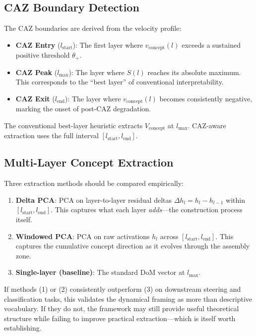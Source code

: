 \documentclass[11pt,a4paper]{article}
\begin{document}
\subsection{CAZ Boundary Detection}

The CAZ boundaries are derived from the velocity profile:
\begin{itemize}
	\item \textbf{CAZ Entry} ($l_\text{start}$): The first layer where
	      $v_\text{concept}(l)$ exceeds a sustained positive threshold $\theta_+$.
	\item \textbf{CAZ Peak} ($l_\text{max}$): The layer where $S(l)$ reaches its
	      absolute maximum. This corresponds to the ``best layer'' of conventional
	      interpretability.
	\item \textbf{CAZ Exit} ($l_\text{end}$): The layer where $v_\text{concept}(l)$
	      becomes consistently negative, marking the onset of post-CAZ degradation.
\end{itemize}

The conventional best-layer heuristic extracts $V_\text{concept}$ at $l_\text{max}$.
CAZ-aware extraction uses the full interval $[l_\text{start}, l_\text{end}]$.

\subsection{Multi-Layer Concept Extraction}

Three extraction methods should be compared empirically:

\begin{enumerate}
	\item \textbf{Delta PCA}: PCA on layer-to-layer residual deltas
	      $\Delta h_l = h_l - h_{l-1}$ within $[l_\text{start}, l_\text{end}]$.
	      This captures what each layer \emph{adds}---the construction process itself.
	\item \textbf{Windowed PCA}: PCA on raw activations $h_l$ across
	      $[l_\text{start}, l_\text{end}]$. This captures the cumulative concept
	      direction as it evolves through the assembly zone.
	\item \textbf{Single-layer (baseline)}: The standard DoM vector at $l_\text{max}$.
\end{enumerate}

If methods (1) or (2) consistently outperform (3) on downstream steering and
classification tasks, this validates the dynamical framing as more than descriptive
vocabulary. If they do not, the framework may still provide useful theoretical
structure while failing to improve practical extraction---which is itself worth
establishing.
\end{document}
